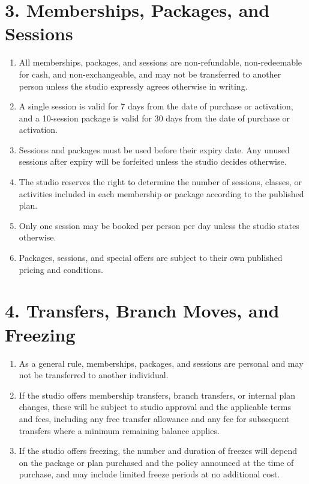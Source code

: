 \documentclass[12pt,a4paper]{article}
\begin{document}
\section*{3. Memberships, Packages, and Sessions}
\begin{enumerate}
    \item All memberships, packages, and sessions are non-refundable, non-redeemable for cash, and non-exchangeable, and may not be transferred to another person unless the studio expressly agrees otherwise in writing.
    \item A single session is valid for 7 days from the date of purchase or activation, and a 10-session package is valid for 30 days from the date of purchase or activation.
    \item Sessions and packages must be used before their expiry date. Any unused sessions after expiry will be forfeited unless the studio decides otherwise.
    \item The studio reserves the right to determine the number of sessions, classes, or activities included in each membership or package according to the published plan.
    \item Only one session may be booked per person per day unless the studio states otherwise.
    \item Packages, sessions, and special offers are subject to their own published pricing and conditions.
\end{enumerate}

\section*{4. Transfers, Branch Moves, and Freezing}
\begin{enumerate}
    \item As a general rule, memberships, packages, and sessions are personal and may not be transferred to another individual.
    \item If the studio offers membership transfers, branch transfers, or internal plan changes, these will be subject to studio approval and the applicable terms and fees, including any free transfer allowance and any fee for subsequent transfers where a minimum remaining balance applies.
    \item If the studio offers freezing, the number and duration of freezes will depend on the package or plan purchased and the policy announced at the time of purchase, and may include limited freeze periods at no additional cost.
\end{enumerate}
\end{document}
